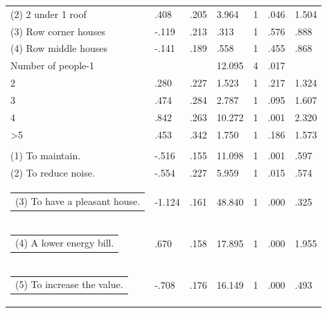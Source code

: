 \documentclass[preprint,12pt,3p]{elsarticle}
\begin{document}
\begin{footnotesize}
\begin{longtable}[c]{@{}lllllll@{}}
(2) 2 under 1 roof                                                                                       & .408   & .205 & 3.964  & 1  & .046 & 1.504  \\
(3) Row corner houses                                                                                    & -.119  & .213 & .313   & 1  & .576 & .888   \\
(4) Row middle houses                                                                                    & -.141  & .189 & .558   & 1  & .455 & .868   \\
Number of people-1                                                                                       &        &      & 12.095 & 4  & .017 &        \\
2                                                                                                        & .280   & .227 & 1.523  & 1  & .217 & 1.324  \\
3                                                                                                        & .474   & .284 & 2.787  & 1  & .095 & 1.607  \\
4                                                                                                        & .842   & .263 & 10.272 & 1  & .001 & 2.320  \\
\textgreater{}5                                                                                          & .453   & .342 & 1.750  & 1  & .186 & 1.573  \\
\begin{tabular}[c]{@{}l@{}}Driver (s)-\\ (1) To maintain.\end{tabular} & -.516  & .155 & 11.098 & 1  & .001 & .597   \\
(2) To reduce noise.                                                                                         & -.554  & .227 & 5.959  & 1  & .015 & .574   \\
\begin{tabular}[c]{@{}l@{}}(3) To have a pleasant house.\end{tabular}                                & -1.124 & .161 & 48.840 & 1  & .000 & .325   \\
\begin{tabular}[c]{@{}l@{}} (4) A lower energy bill.\end{tabular} & .670   & .158 & 17.895 & 1  & .000 & 1.955  \\
\begin{tabular}[c]{@{}l@{}}(5) To increase the value.\end{tabular}                             & -.708  & .176 & 16.149 & 1  & .000 & .493   \\


\end{longtable}
\end{footnotesize}
\end{document}
